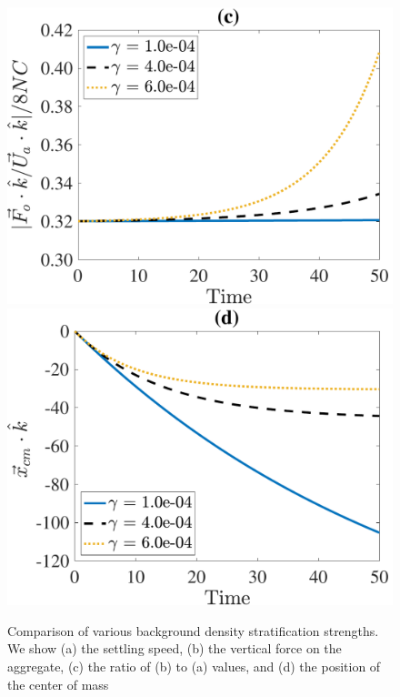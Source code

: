 \begin{figure}[h]
\begin{center}
		\includegraphics[scale=0.35]{./figures/fig_NC50_g_Fo3Ua_ratio}
		\includegraphics[scale=0.35]{./figures/fig_NC50_g_cm3_all}
	\caption{Comparison of various background density stratification strengths. We show (a) the settling speed, (b) the vertical force on the aggregate, (c) the ratio of (b) to (a) values, and (d) the position of the center of mass }
	\label{fig_NC50_gg}
\end{center}
\end{figure}
